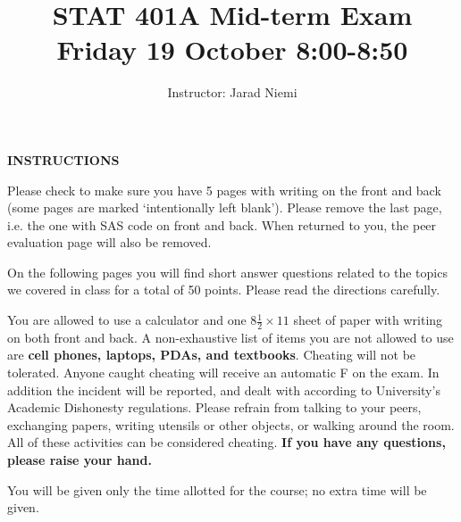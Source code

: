 \documentclass[10pt,draft]{article}
\title{STAT 401A Mid-term Exam \\ Friday 19 October 8:00-8:50}
\author{Instructor: Jarad Niemi}
\date{}
\begin{document}
\maketitle


\bigskip


\textbf{INSTRUCTIONS}

\bigskip

Please check to make sure you have 5 pages with writing on the front and back (some pages are marked `intentionally left blank'). Please remove the last page, i.e. the one with SAS code on front and back. When returned to you, the peer evaluation page will also be removed.

\bigskip

On the following pages you will find short answer questions related to the topics we covered in class for a total of 50 points. Please read the directions carefully.

\bigskip

You are allowed to use a calculator and one $8\frac{1}{2}\times 11$ sheet of paper with writing on both front and back. A non-exhaustive list of items you are not allowed to use are {\bf cell phones, laptops, PDAs, and textbooks}. Cheating will not be tolerated. Anyone caught cheating will receive an automatic F on the exam. In addition the incident will be reported, and dealt with according to University's Academic Dishonesty regulations. Please refrain from talking to your peers, exchanging papers, writing utensils or other objects, or walking around the room. All of these activities can be considered cheating. {\bf If you have any questions, please raise your hand.}

\bigskip

You will be given only the time allotted for the course; no extra time will be given.

\bigskip
\end{document}
